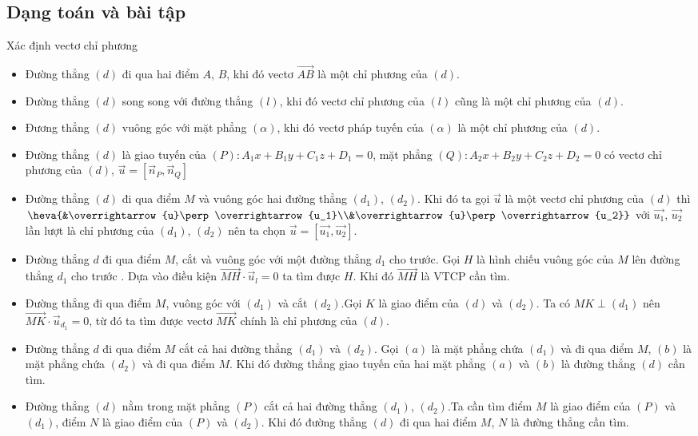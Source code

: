  \subsection{Dạng toán và bài tập}
	\begin{dang}{Xác định vectơ chỉ phương}%
		\begin{itemize}
			\item Đường thẳng $(d)$ đi qua hai điểm $A$, $B$, khi đó vectơ $\overrightarrow{AB}$ là một chỉ phương của $(d)$.
			\item Đường thẳng $(d)$ song song với đường thẳng $(l)$, khi đó vectơ chỉ phương của $(l)$ cũng là một chỉ phương của $(d)$.
			\item Đương thẳng $(d)$ vuông góc với mặt phẳng $(\alpha)$, khi đó vectơ pháp tuyến của $(\alpha)$ là một chỉ phương của $(d)$.
			\item Đường thẳng $(d)$ là giao tuyến của $(P)\colon A_1x+B_1y+C_1z+D_1=0$, mặt phẳng $(Q)\colon A_2x+B_2y+C_2z+D_2=0$ có vectơ chỉ phương của $(d)$, $\overrightarrow{u}=\left[\overrightarrow{n}_{P},\overrightarrow{n}_{Q}\right] $
			\item Đường thẳng $(d)$ đi qua điểm $M$ và vuông góc hai đường thẳng $(d_1)$, $(d_2)$. Khi đó ta gọi $\overrightarrow{u}$ là một vectơ chỉ phương của $(d)$ thì $\heva{&\overrightarrow{u}\perp\overrightarrow{u_1}\\&\overrightarrow{u}\perp\overrightarrow{u_2}}$ với $\overrightarrow{u_1}$, $\overrightarrow{u_2}$ lần lượt là chỉ phương của $(d_1)$, $(d_2)$ nên ta chọn $\overrightarrow{u}=\left[ \overrightarrow{u_1},\overrightarrow{u_2}\right] $.
			\item Đường thẳng $d$ đi qua điểm $M$, cắt và vuông góc với một đường thẳng $d_1$ cho trước. Gọi $H$ là hình chiếu vuông góc của $M$ lên đường thẳng $d_1$ cho trước . Dựa vào điều kiện $\overrightarrow{MH}\cdot\overrightarrow{u}_{l}=0$ ta tìm được $H$. Khi đó $\overrightarrow{MH} $ là  VTCP cần tìm.
			\item Đường thẳng đi qua điểm $M$, vuông góc với $(d_1)$ và cắt $(d_2)$.Gọi $K$ là giao điểm của $(d)$ và $(d_2)$. Ta có $MK\perp (d_1)$ nên $\overrightarrow{MK}\cdot\overrightarrow{u}_{d_1}=0$, từ đó ta tìm được vectơ $\overrightarrow{MK}$ chính là chỉ phương của $(d)$.
			\item Đường thẳng  $d$ đi qua điểm $M$ cắt cả hai đường thẳng $(d_1)$ và $(d_2)$.	Gọi $(a)$ là mặt phẳng chứa $(d_1)$ và đi qua điểm $M$, $(b)$ là mặt phẳng chứa $(d_2)$ và đi qua điểm $M$. Khi đó đường thẳng giao tuyến của hai mặt phẳng $(a)$ và $(b)$ là đường thẳng $(d)$ cần tìm.
			\item Đường thẳng $(d)$ nằm trong mặt phẳng $(P)$ cắt cả hai đường thẳng $(d_1)$, $(d_2)$.Ta cần tìm điểm $M$ là giao điểm của $(P)$ và $(d_1)$, điểm $N$ là giao điểm của $(P)$ và $(d_2)$. Khi đó đường thẳng $(d)$ đi qua hai điểm $M$, $N$ là đường thẳng cần tìm.
			\end{itemize}
	\end{dang}
